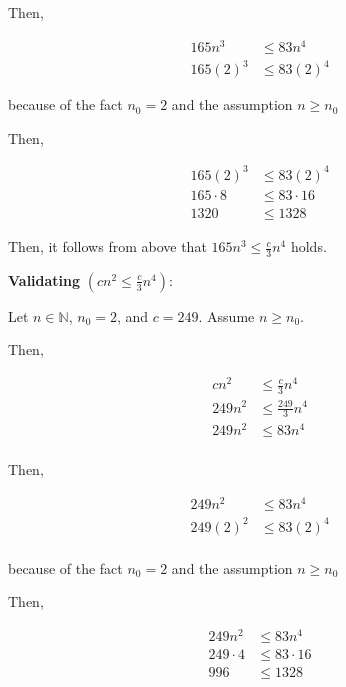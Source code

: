 \documentclass[12pt]{article}
\begin{document}
\begin{enumerate}[a.]
    \bigskip

    Then,

    \begin{align}
        165n^3 &\leq 83n^4\\
        165(2)^3 &\leq 83(2)^4
    \end{align}

    because of the fact $n_0 = 2$ and the assumption $n \geq n_0$

    \bigskip

    Then,

    \begin{align}
        165(2)^3 &\leq 83(2)^4\\
        165 \cdot 8 &\leq 83 \cdot 16\\
        1320 &\leq 1328
    \end{align}

    \bigskip

    Then, it follows from above that $165n^3 \leq \frac{c}{3}n^4$ holds.

    \bigskip

    \textbf{Validating} $(cn^2 \leq \frac{c}{3}n^4)$:

    \bigskip

    Let $n \in \mathbb{N}$, $n_0 = 2$, and $c = 249$. Assume $n \geq n_0$.

    \bigskip

    Then,

    \begin{align}
        cn^2 &\leq \frac{c}{3}n^4\\
        249n^2 &\leq \frac{249}{3}n^4\\
        249n^2 &\leq 83n^4\\
    \end{align}

    \bigskip

    Then,

    \begin{align}
        249n^2 &\leq 83n^4\\
        249(2)^2 &\leq 83(2)^4\\
    \end{align}

    because of the fact $n_0 = 2$ and the assumption $n \geq n_0$

    \bigskip

    Then,

    \begin{align}
        249n^2 &\leq 83n^4\\
        249 \cdot 4 &\leq 83 \cdot 16\\
        996 &\leq 1328
    \end{align}


\end{enumerate}
\end{document}
